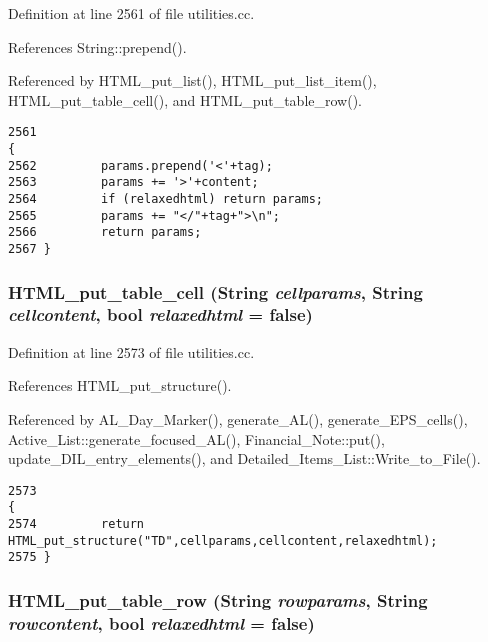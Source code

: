 Definition at line 2561 of file utilities.cc.

References String::prepend().

Referenced by HTML\_\-put\_\-list(), HTML\_\-put\_\-list\_\-item(), HTML\_\-put\_\-table\_\-cell(), and HTML\_\-put\_\-table\_\-row().



\footnotesize\begin{verbatim}2561                                                                                                {
2562         params.prepend('<'+tag);
2563         params += '>'+content;
2564         if (relaxedhtml) return params;
2565         params += "</"+tag+">\n";
2566         return params;
2567 }
\end{verbatim}\normalsize 
{}
\subsubsection{ HTML\_\-put\_\-table\_\-cell ({\bf String} {\em cellparams}, {\bf String} {\em cellcontent}, bool {\em relaxedhtml} = {\bf false})}\label{dil2al_8hh_a264}




Definition at line 2573 of file utilities.cc.

References HTML\_\-put\_\-structure().

Referenced by AL\_\-Day\_\-Marker(), generate\_\-AL(), generate\_\-EPS\_\-cells(), Active\_\-List::generate\_\-focused\_\-AL(), Financial\_\-Note::put(), update\_\-DIL\_\-entry\_\-elements(), and Detailed\_\-Items\_\-List::Write\_\-to\_\-File().



\footnotesize\begin{verbatim}2573                                                                                             {
2574         return HTML_put_structure("TD",cellparams,cellcontent,relaxedhtml);
2575 }
\end{verbatim}\normalsize 
{}
\subsubsection{ HTML\_\-put\_\-table\_\-row ({\bf String} {\em rowparams}, {\bf String} {\em rowcontent}, bool {\em relaxedhtml} = {\bf false})}\label{dil2al_8hh_a263}




